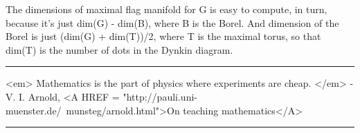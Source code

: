 The dimensions of maximal flag manifold for G is easy to compute, in
turn, because it's just dim(G) - dim(B), where B is the Borel.  And
dimension of the Borel is just (dim(G) + dim(T))/2, where T is the
maximal torus, so that dim(T) is the number of dots in the Dynkin diagram.





 \par\noindent\rule{\textwidth}{0.4pt}
<em> Mathematics is the part of physics
where experiments are cheap. </em> - V. I. Arnold, <A HREF = "http://pauli.uni-muenster.de/~munsteg/arnold.html">On teaching mathematics</A>

\par\noindent\rule{\textwidth}{0.4pt}

